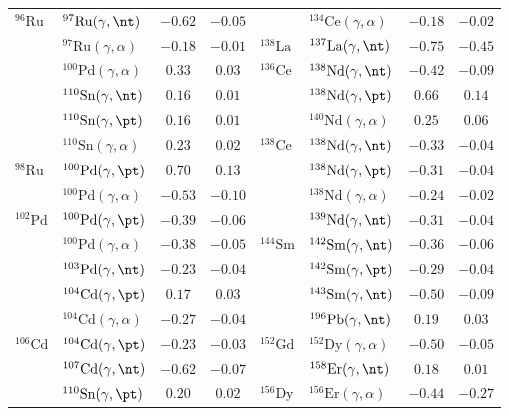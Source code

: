 {\begin{longtable}{llcc llcc}
$^{96}\mathrm{Ru}$ & $^{97}\mathrm{Ru}(\gamma,\nt)$ & $-0.62$ & $-0.05$ & $ $ & $^{134}\mathrm{Ce}(\gamma,\alpha)$ & $-0.18$ & $-0.02$ \\ 
$ $ & $^{97}\mathrm{Ru}(\gamma,\alpha)$ & $-0.18$ & $-0.01$ & $^{138}\mathrm{La}$ & $^{137}\mathrm{La}(\gamma,\nt)$ & $-0.75$ & $-0.45$ \\ 
$ $ & $^{100}\mathrm{Pd}(\gamma,\alpha)$ & $0.33$ & $0.03$ & $^{136}\mathrm{Ce}$ & $^{138}\mathrm{Nd}(\gamma,\nt)$ & $-0.42$ & $-0.09$ \\ 
$ $ & $^{110}\mathrm{Sn}(\gamma,\nt)$ & $0.16$ & $0.01$ & $ $ & $^{138}\mathrm{Nd}(\gamma,\pt)$ & $0.66$ & $0.14$ \\ 
$ $ & $^{110}\mathrm{Sn}(\gamma,\pt)$ & $0.16$ & $0.01$ & $ $ & $^{140}\mathrm{Nd}(\gamma,\alpha)$ & $0.25$ & $0.06$ \\ 
$ $ & $^{110}\mathrm{Sn}(\gamma,\alpha)$ & $0.23$ & $0.02$ & $^{138}\mathrm{Ce}$ & $^{138}\mathrm{Nd}(\gamma,\nt)$ & $-0.33$ & $-0.04$ \\ 
$^{98}\mathrm{Ru}$ & $^{100}\mathrm{Pd}(\gamma,\pt)$ & $0.70$ & $0.13$ & $ $ & $^{138}\mathrm{Nd}(\gamma,\pt)$ & $-0.31$ & $-0.04$ \\ 
$ $ & $^{100}\mathrm{Pd}(\gamma,\alpha)$ & $-0.53$ & $-0.10$ & $ $ & $^{138}\mathrm{Nd}(\gamma,\alpha)$ & $-0.24$ & $-0.02$ \\ 
$^{102}\mathrm{Pd}$ & $^{100}\mathrm{Pd}(\gamma,\pt)$ & $-0.39$ & $-0.06$ & $ $ & $^{139}\mathrm{Nd}(\gamma,\nt)$ & $-0.31$ & $-0.04$ \\ 
$ $ & $^{100}\mathrm{Pd}(\gamma,\alpha)$ & $-0.38$ & $-0.05$ & $^{144}\mathrm{Sm}$ & $^{142}\mathrm{Sm}(\gamma,\nt)$ & $-0.36$ & $-0.06$ \\ 
$ $ & $^{103}\mathrm{Pd}(\gamma,\nt)$ & $-0.23$ & $-0.04$ & $ $ & $^{142}\mathrm{Sm}(\gamma,\pt)$ & $-0.29$ & $-0.04$ \\ 
$ $ & $^{104}\mathrm{Cd}(\gamma,\pt)$ & $0.17$ & $0.03$ & $ $ & $^{143}\mathrm{Sm}(\gamma,\nt)$ & $-0.50$ & $-0.09$ \\ 
$ $ & $^{104}\mathrm{Cd}(\gamma,\alpha)$ & $-0.27$ & $-0.04$ & $ $ & $^{196}\mathrm{Pb}(\gamma,\nt)$ & $0.19$ & $0.03$ \\ 
$^{106}\mathrm{Cd}$ & $^{104}\mathrm{Cd}(\gamma,\pt)$ & $-0.23$ & $-0.03$ & $^{152}\mathrm{Gd}$ & $^{152}\mathrm{Dy}(\gamma,\alpha)$ & $-0.50$ & $-0.05$ \\ 
$ $ & $^{107}\mathrm{Cd}(\gamma,\nt)$ & $-0.62$ & $-0.07$ & $ $ & $^{158}\mathrm{Er}(\gamma,\nt)$ & $0.18$ & $0.01$ \\ 
$ $ & $^{110}\mathrm{Sn}(\gamma,\pt)$ & $0.20$ & $0.02$ & $^{156}\mathrm{Dy}$ & $^{156}\mathrm{Er}(\gamma,\alpha)$ & $-0.44$ & $-0.27$ \\ 

\end{longtable}}
